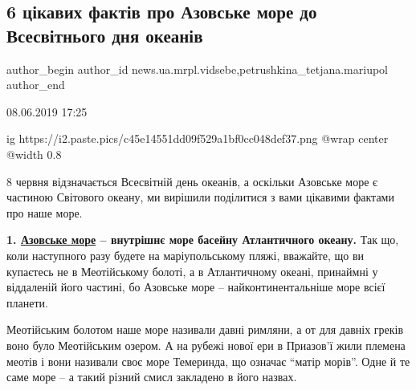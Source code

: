  
 
 
 
 
 
\subsection{6 цікавих фактів про Азовське море до Всесвітнього дня океанів}
\label{sec:08_06_2019.stz.news.ua.mrpl.vidsebe.1.6_cikavyh_faktiv_azov_more_den_okeaniv}
 
\ifcmt
 author_begin
   author_id news.ua.mrpl.vidsebe,petrushkina_tetjana.mariupol
 author_end
\fi

08.06.2019 17:25

\ifcmt
  ig https://i2.paste.pics/c45e14551dd09f529a1bf0cc048def37.png
  @wrap center
  @width 0.8
\fi

\begin{qqquote}
\Large
8 червня відзначається Всесвітній день океанів, а оскільки Азовське море є
частиною Світового океану, ми вирішили поділитися з вами цікавими фактами про
наше море.
\end{qqquote}


\textbf{1. \href{https://kirillovka.ks.ua/azov-sea}{Азовське море} – внутрішнє море басейну Атлантичного океану.} Так що, коли
наступного разу будете на маріупольському пляжі, вважайте, що ви купаєтесь не в
Меотійському болоті, а в Атлантичному океані, принаймні у віддаленій його
частині, бо Азовське море – найконтинентальніше море всієї планети.

Меотійським болотом наше море називали давні римляни, а от для давніх греків
воно було Меотійським озером. А на рубежі нової ери в Приазов'ї жили племена
меотів і вони називали своє море Темеринда, що означає \enquote{матір морів}. Одне й те
саме море – а такий різний смисл закладено в його назвах.


